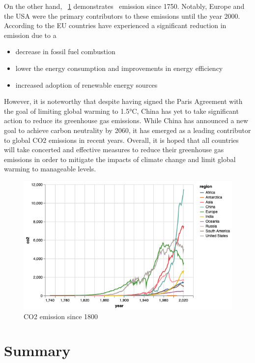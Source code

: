 \newpage 
On the other hand, ~\ref{fig:co2_emission_by_region} demonstrates \coo\ emission since 1750. 
Notably, Europe and the USA were the primary contributors to these emissions until the year 2000. 
According to the \cite{why-are-greenhouse-gases-decreasing} EU countries have experienced a significant reduction in emission due to a 
\begin{itemize}
  \item decrease in fossil fuel combustion
  \item lower the energy consumption and improvements in energy efficiency
  \item increased adoption of renewable energy sources
\end{itemize}
However, it is noteworthy that despite having signed the Paris Agreement with the goal of limiting global warming to 1.5°C, China has yet to take significant action to reduce its greenhouse gas emissions. While China has announced a new goal to achieve carbon neutrality by 2060, it has emerged as a leading contributor to global CO2 emissions in recent years.
\newline
Overall, it is hoped that all countries will take concerted and effective measures to reduce their greenhouse gas emissions in order to mitigate the impacts of climate change and limit global warming to manageable levels.

\begin{figure}[h]
  \includegraphics[width=\linewidth]{img/co2emission_by_region.png}
  \caption{CO2 emission since 1800}
  \label{fig:co2_emission_by_region}
\end{figure}



\section{Summary}
